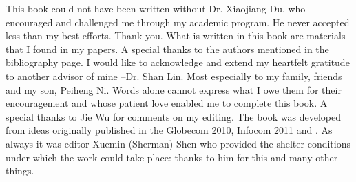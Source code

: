 


This book could not have been written without Dr. Xiaojiang Du, who
encouraged and challenged me through my academic program. He never
accepted less than my best efforts. Thank you. What is written in
this book are materials that I found in my papers. A
special thanks to the authors mentioned in the bibliography page. I
would like to acknowledge and extend my heartfelt gratitude to another advisor
of mine --Dr. Shan Lin. Most especially to my family,
friends and my son, Peiheng Ni. Words alone cannot express what I
owe them for their encouragement and whose patient love enabled me
to complete this book. A special thanks to Jie Wu for comments on my
editing. The book was developed from ideas originally published in the Globecom 2010, Infocom 2011 and \cite{hanselman}. As always it was editor Xuemin (Sherman) Shen who provided the shelter conditions under which the work could take place: thanks to him
for this and many other things.  
